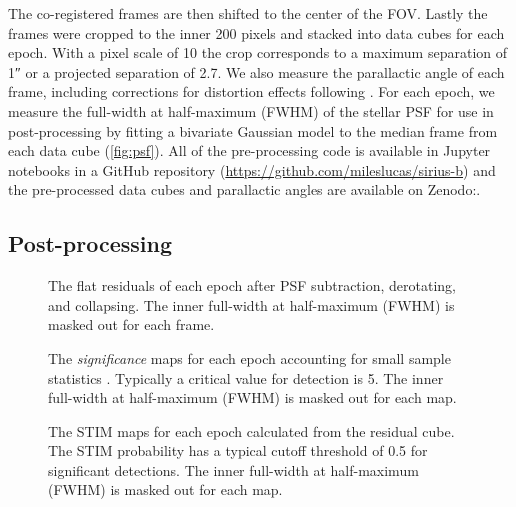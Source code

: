 \documentclass[twocolumn]{aastex631}
\begin{document}
The co-registered frames are then shifted to the center of the FOV. Lastly the frames were cropped to the inner 200 pixels and stacked into data cubes for each epoch. With a pixel scale of \qty{10}{\milliarcsecond} the crop corresponds to a maximum separation of \ang{;;1} or a projected separation of \qty{2.7}{\au}. We also measure the parallactic angle of each frame, including corrections for distortion effects following \citet{yelda_improving_2010}. For each epoch, we measure the full-width at half-maximum (FWHM) of the stellar PSF for use in post-processing by fitting a bivariate Gaussian model to the median frame from each data cube (\autoref{fig:psf}). All of the pre-processing code is available in Jupyter notebooks in a GitHub repository (\href{https://github.com/mileslucas/sirius-b}{https://github.com/mileslucas/sirius-b}) and the pre-processed data cubes and parallactic angles are available on Zenodo:.

\subsection{Post-processing}

\begin{figure*}
    \centering
    \caption{The flat residuals of each epoch after PSF subtraction, derotating, and collapsing. The inner full-width at half-maximum (FWHM) is masked out for each frame.}
    \label{fig:residuals}
\end{figure*}

\begin{figure*}
    \centering
    \caption{The \textit{significance} maps for each epoch accounting for small sample statistics \citep{mawet_fundamental_2014}. Typically a critical value for detection is 5. The inner full-width at half-maximum (FWHM) is masked out for each map.}
    \label{fig:sig}
\end{figure*}

\begin{figure*}
    \centering
    \caption{The STIM maps for each epoch calculated from the residual cube. The STIM probability has a typical cutoff threshold of 0.5 for significant detections. The inner full-width at half-maximum (FWHM) is masked out for each map.}
    \label{fig:stim}
\end{figure*}
\end{document}
